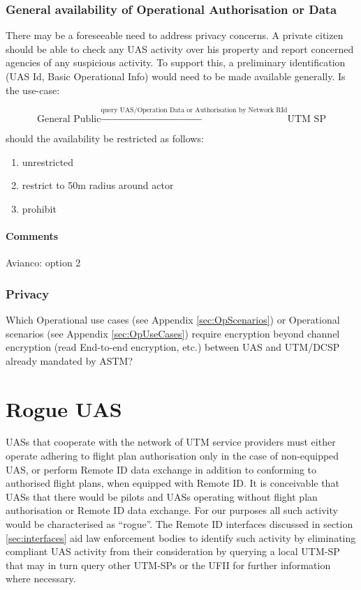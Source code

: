 \documentclass{ua_wgs_base}
\begin{document}
\subsubsection{General availability of Operational Authorisation or Data\label{subsec:availability-of-operational}}

There may be a foreseeable need to address privacy concerns. A private citizen should be able to check any UAS activity over his property and report concerned agencies of any suspicious activity. To support this, a preliminary identification (UAS Id, Basic Operational Info) would need to be made available generally. Is the use-case: 

\[
\text{General Public}\ensuremath{\xrightarrow{\text{query UAS/Operation Data or Authorisation by Network RId}}}\text{UTM SP}
\]
 
should the availability be restricted as follows: 
\begin{enumerate}
\item unrestricted
\item restrict to 50m radius around actor
\item prohibit
\end{enumerate}

\paragraph{Comments}

Avianco: option 2

\subsubsection{Privacy}
Which Operational use cases (see Appendix \ref{sec:OpScenarios})
or Operational scenarios (see Appendix \ref{sec:OpUseCases})
require encryption beyond channel
encryption (read End-to-end encryption, etc.) between UAS and UTM/DCSP already mandated by ASTM?


\section{Rogue UAS}

UASs that cooperate with the network of UTM service providers must either 
operate adhering to flight plan authorisation only in the case of 
non-equipped UAS, or perform Remote ID data exchange in addition to 
conforming to authorised flight plans, when equipped with Remote ID. 
It is conceivable that UASs that there would be pilots and UASs operating
without flight plan authorisation or Remote ID data exchange. For our 
purposes all such activity would be characterised as ``rogue''. The Remote
ID interfaces discussed in section \ref{sec:interfaces} aid law 
enforcement bodies to identify such activity by eliminating compliant
UAS activity from their consideration by querying a local UTM-SP that may 
in turn query other UTM-SPs or the UFII for further information where 
necessary.
\end{document}
